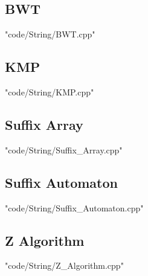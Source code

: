 \documentclass [landscape,8pt,a4paper,twocolumn]{article}
\begin{document}
\subsection{BWT}
 {"code/String/BWT.cpp"}
\subsection{KMP}
 {"code/String/KMP.cpp"}
\subsection{Suffix Array}
 {"code/String/Suffix_Array.cpp"}
\subsection{Suffix Automaton}
 {"code/String/Suffix_Automaton.cpp"}
\subsection{Z Algorithm}
 {"code/String/Z_Algorithm.cpp"}

\newpage

\end{document}

